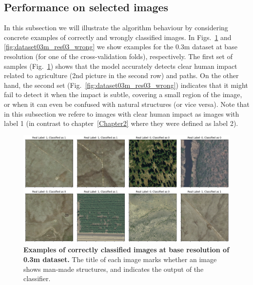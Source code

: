 \subsection{Performance on selected images}
\label{seq:selected_images}
In this subsection we will illustrate the algorithm behaviour by considering concrete examples of correctly and wrongly classified images. In Figs.~\ref{fig:dataset03m_res03_correct} and \ref{fig:dataset03m_res03_wrong} we show examples for the 0.3m dataset at base resolution (for one of the cross-validation folds), respectively.
The first set of samples (Fig.~\ref{fig:dataset03m_res03_correct}) shows that the model accurately detects clear human impact related to agriculture (2nd picture in the second row) and paths. On the other hand, the second set (Fig.~\ref{fig:dataset03m_res03_wrong}) indicates that it might fail to detect it when the impact is subtle, covering a small region of the image, or when it can even be confused with natural structures (or vice versa). Note that in this subsection we refere to images with clear human impact as images with label 1 (in contrast to chapter~\ref{Chapter2} where they were defined as label 2).

\begin{figure}[H]
	\centering
	\captionsetup{width=1\linewidth}
	\includegraphics[width=1\textwidth]{Figures/results/class_dataset03m_res03_correct.png}
	\caption{\textbf{Examples of correctly classified images at base resolution of 0.3m dataset.} The title of each image marks whether an image shows man-made structures, and indicates the output of the classifier.}
	\label{fig:dataset03m_res03_correct}
\end{figure}

